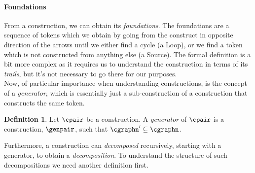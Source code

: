 \documentclass[a4paper]{article}
\theoremstyle{definition}
\newtheorem{definition}{Definition}
\begin{document}
		\paragraph{Foundations} From a construction, we can obtain its \textit{foundations}. The foundations are a sequence of tokens which we obtain by going from the construct in opposite direction of the arrows until we either find a cycle (a Loop), or we find a token which is not constructed from anything else (a Source). The formal definition is a bit more complex as it requires us to understand the construction in terms of its \textit{trails}, but it's not necessary to go there for our purposes.\\

		Now, of particular importance when understanding constructions, is the concept of a \textit{generator}, which is essentially just a sub-construction of a construction that constructs the same token.
		
		\begin{definition}
			Let $\cpair$ be a construction. A \textit{generator} of $\cpair$ is a construction, $\genpair$, such that $\cgraphn'\subseteq \cgraphn$.
		\end{definition}
	
%	
%	
	
		Furthermore, a construction can \textit{decomposed} recursively, starting with a generator, to obtain a \textit{decomposition}. To understand the structure of such decompositions we need another definition first.
	
\end{document}
